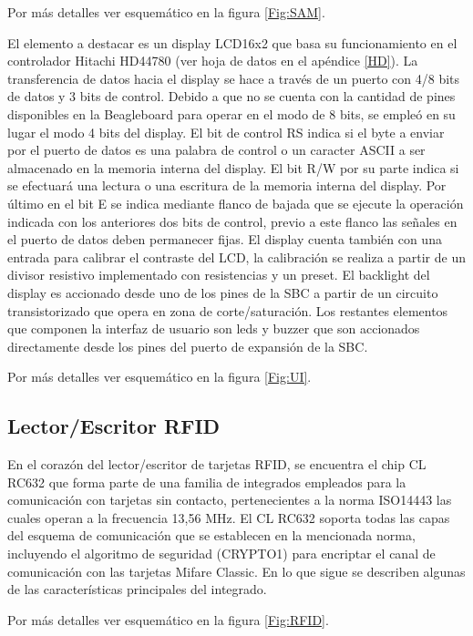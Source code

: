 Por más detalles ver esquemático en la figura \ref{Fig:SAM}.

\newpage
{}

El elemento a destacar es un display LCD16x2 que basa su funcionamiento en el controlador Hitachi HD44780 \cite{dpy} (ver hoja de datos en el apéndice \ref{HD}). La transferencia de datos hacia el display se hace a través de un puerto con 4/8 bits de datos y 3 bits de control. Debido a que no se cuenta con la cantidad de pines disponibles en la Beagleboard para operar en el modo de 8 bits, se empleó en su lugar el modo 4 bits del display. El bit de control RS indica si el byte a enviar por el puerto de datos es una palabra de control o un caracter ASCII a ser almacenado en la memoria interna del display. El bit R/W por su parte indica si se efectuará una lectura o una escritura de la memoria interna del display. Por último en el bit E se indica mediante flanco de bajada que se ejecute la operación indicada con los anteriores dos bits de control, previo a este flanco las señales en el puerto de datos deben permanecer fijas.
El display cuenta también con una entrada para calibrar el contraste del LCD, la calibración se realiza a partir de un divisor resistivo implementado con resistencias y un preset.
El backlight del display es accionado desde uno de los pines de la SBC a partir de un circuito transistorizado que opera en zona de corte/saturación.
Los restantes elementos que componen la interfaz de usuario son leds y buzzer que son accionados directamente desde los pines del puerto de expansión de la SBC.

Por más detalles ver esquemático en la figura \ref{Fig:UI}.

\subsection{Lector/Escritor RFID}
En el corazón del lector/escritor de tarjetas RFID, se encuentra el chip CL RC632 que forma parte de una familia de integrados empleados para la comunicación con tarjetas sin contacto, pertenecientes a la norma ISO14443 las cuales operan a la frecuencia 13,56 MHz.
El CL RC632 soporta todas las capas del esquema de comunicación que se establecen en la mencionada norma, incluyendo el algoritmo de seguridad (CRYPTO1) para encriptar el canal de comunicación con las tarjetas Mifare Classic. En lo que sigue se describen algunas de las características principales del integrado.

Por más detalles ver esquemático en la figura \ref{Fig:RFID}.


